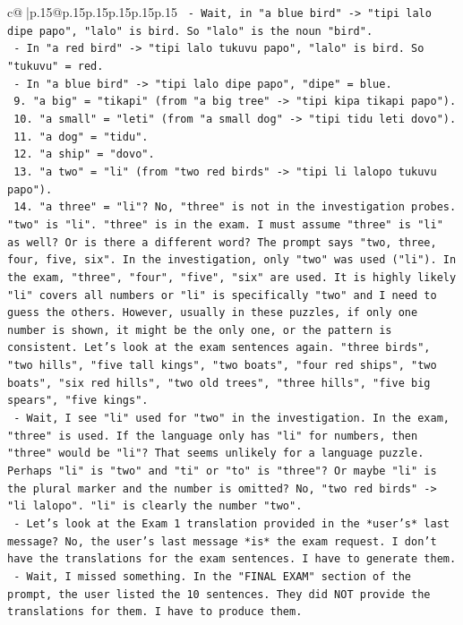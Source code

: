\documentclass{article}
\begin{document}
{\begin{supertabular}{c@{$\;$}|p{.15\linewidth}@{}p{.15\linewidth}p{.15\linewidth}p{.15\linewidth}p{.15\linewidth}p{.15\linewidth}}
{{{\texttt{         {-} Wait, in "a blue bird" {-}> "tipi lalo dipe papo", "lalo" is bird. So "lalo" is the noun "bird".} \\
\texttt{         {-} In "a red bird" {-}> "tipi lalo tukuvu papo", "lalo" is bird. So "tukuvu" = red.} \\
\texttt{         {-} In "a blue bird" {-}> "tipi lalo dipe papo", "dipe" = blue.} \\
\texttt{      9. "a big" = "tikapi" (from "a big tree" {-}> "tipi kipa tikapi papo").} \\
\texttt{      10. "a small" = "leti" (from "a small dog" {-}> "tipi tidu leti dovo").} \\
\texttt{      11. "a dog" = "tidu".} \\
\texttt{      12. "a ship" = "dovo".} \\
\texttt{      13. "a two" = "li" (from "two red birds" {-}> "tipi li lalopo tukuvu papo").} \\
\texttt{      14. "a three" = "li"? No, "three" is not in the investigation probes. "two" is "li". "three" is in the exam. I must assume "three" is "li" as well? Or is there a different word? The prompt says "two, three, four, five, six". In the investigation, only "two" was used ("li"). In the exam, "three", "four", "five", "six" are used. It is highly likely "li" covers all numbers or "li" is specifically "two" and I need to guess the others. However, usually in these puzzles, if only one number is shown, it might be the only one, or the pattern is consistent. Let's look at the exam sentences again. "three birds", "two hills", "five tall kings", "two boats", "four red ships", "two boats", "six red hills", "two old trees", "three hills", "five big spears", "five kings".} \\
\texttt{      {-} Wait, I see "li" used for "two" in the investigation. In the exam, "three" is used. If the language only has "li" for numbers, then "three" would be "li"? That seems unlikely for a language puzzle. Perhaps "li" is "two" and "ti" or "to" is "three"? Or maybe "li" is the plural marker and the number is omitted? No, "two red birds" {-}> "li lalopo". "li" is clearly the number "two".} \\
\texttt{      {-} Let's look at the Exam 1 translation provided in the *user's* last message? No, the user's last message *is* the exam request. I don't have the translations for the exam sentences. I have to generate them.} \\
\texttt{      {-} Wait, I missed something. In the "FINAL EXAM" section of the prompt, the user listed the 10 sentences. They did NOT provide the translations for them. I have to produce them.} \\
}}}
\end{supertabular}}
\end{document}
